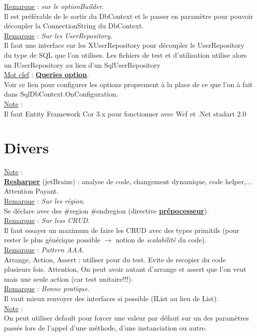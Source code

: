 \documentclass[a4paper,12pt,twoside]{article}
\newcommand{\urlcolor}{magenta}  %
\newcommand{\keycolor}{purple} %
\newcommand{\incode}[1]{{\footnotesize\ttfamily #1}} %
\newcommand{\rem}[2]{\noindent\underline{Remarque} : \textit{#1}.\\ \indent #2}
\newcommand{\note}[1]{\noindent\underline{Note} : \\ \indent #1}
\newcommand{\keyref}[2]{\hypersetup{urlcolor=\keycolor} \href{#1}{\textbf{#2}}\hypersetup{urlcolor=\urlcolor}}
\newcommand{\keyword}[3]{\noindent\underline{Mot clef} : \keyref{#1}{#2}. \\ \indent #3}
\begin{document}
\rem{sur le optionBuilder}{Il est préférable de le sortir du DbContext et le passer en paramètre pour pouvoir découpler la ConnectionString du DbContext.}\\

\rem{Sur les UserRepository}{Il faut une interface sur les XUserRepository pour découpler le UserRepository du type de SQL que l'on utilises. Les fichiers de test et d'utilisation utilise alors un IUserRepository au lieu d'un SqlUserRepository}\\

\keyword{https://docs.microsoft.com/fr-fr/ef/core/dbcontext-configuration/}{Queries option}{Voir ce lien pour configurer les options proprement à la place de ce que l'on à fait dans SqlDbContext.OnConfiguration.}\\

\note{Il faut Entity Framework Cor 3.x pour fonctionner avec Wcf et .Net stadart 2.0}

\section{Divers}

\note{\keyref{https://www.jetbrains.com/fr-fr/resharper/}{Resharper} (jetBrains) : analyse de code, changement dynamique, code helper,... Attention Payant.}\\

\rem{Sur les région}{Se déclare avec des \#region \#endregion (directive \keyref{https://docs.microsoft.com/fr-fr/dotnet/csharp/language-reference/preprocessor-directives}{prépocesseur}).}\\

\rem{Sur less CRUD}{Il faut essayer un maximum de faire les CRUD avec des types primitifs (pour rester le plus générique possible $\to$ notion de \textit{scalabilité} du code).}\\

\rem{Pattern AAA}{Arrange, Action, Assert : utiliser pour du test. Evite de recopier du code plusieurs fois. Attention, On peut avoir autant d'arrange et assert que l'on veut mais une seule action (car test unitaire!!!).}\\

\rem{Bonne pratique}{Il vaut mieux renvoyer des interfaces si possible (IList au lieu de List).}\\

\note{On peut utiliser \incode{default} pour forcer une valeur par défaut sur un des paramètres passés lors de l'appel d'une méthode, d'une instanciation ou autre.}\\
\end{document}

